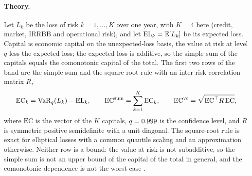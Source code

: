 \paragraph{Theory.}
Let $L_k$ be the loss of risk $k=1,\dots,K$ over one year, with $K=4$ here (credit, market, IRRBB and operational risk), and let
$\mathrm{EL}_k=\mathbb{E}[L_k]$ be its expected loss. Capital is economic capital on the unexpected-loss basis, the value at risk at level
$q$ less the expected loss; the expected loss is additive, so the simple sum of the capitals equals the comonotonic capital of
the total. The first two rows of the band are the simple sum and the square-root rule
with an inter-risk correlation matrix $R$,
\begin{equation}
\mathrm{EC}_k=\operatorname{VaR}_q(L_k)-\mathrm{EL}_k,\qquad
\mathrm{EC}^{\mathrm{sum}}=\sum_{k=1}^{K}\mathrm{EC}_k,\qquad
\mathrm{EC}^{\mathrm{vc}}=\sqrt{\mathrm{EC}^{\top}R\,\mathrm{EC}},
\label{eq:ag-ec}
\end{equation}
where $\mathrm{EC}$ is the vector of the $K$ capitals, $q=0.999$ is the confidence level, and $R$ is symmetric positive
semidefinite with a unit diagonal. The square-root rule is exact for elliptical losses with a common quantile scaling and an
approximation otherwise. Neither row is a bound: the value at risk is not subadditive, so the simple sum is not an upper bound
of the capital of the total in general, and the comonotonic dependence is not the worst case
\citep{aggregation-stress:embrechts2002,aggregation-stress:embrechts2013}.

